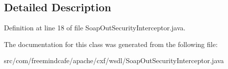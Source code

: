 \subsection{Detailed Description}


Definition at line 18 of file Soap\+Out\+Security\+Interceptor.\+java.



The documentation for this class was generated from the following file\+:\begin{DoxyCompactItemize}
\item 
src/com/freemindcafe/apache/cxf/wsdl/Soap\+Out\+Security\+Interceptor.\+java\end{DoxyCompactItemize}
